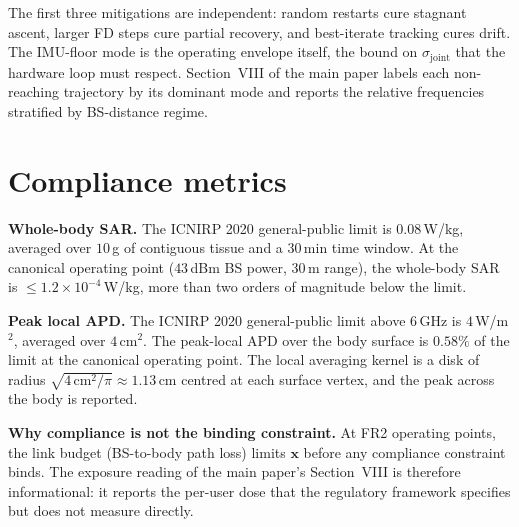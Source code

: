 \documentclass[10pt,journal,twocolumn]{IEEEtran}
\newcommand{\xx}{\mathbf{x}}
\theoremstyle{plain}
\theoremstyle{definition}
\begin{document}
The first three mitigations are independent: random restarts cure
stagnant ascent, larger FD steps cure partial recovery, and
best-iterate tracking cures drift. The IMU-floor mode is the
operating envelope itself, the bound on $\sigma_\mathrm{joint}$
that the hardware loop must respect. Section~VIII of the main
paper labels each non-reaching trajectory by its dominant mode and
reports the relative frequencies stratified by BS-distance regime.

\section{Compliance metrics}\label{si:compliance}

\textbf{Whole-body SAR.} The ICNIRP 2020 general-public limit is
$0.08\,$W/kg, averaged over $10\,$g of contiguous tissue and a
$30\,$min time window. At the canonical operating point
($43\,$dBm BS power, $30\,$m range), the whole-body SAR is
$\leq 1.2 \times 10^{-4}\,$W/kg, more than two orders of magnitude
below the limit.

\textbf{Peak local APD.} The ICNIRP 2020 general-public limit
above $6\,$GHz is $4\,$W/m$^{2}$, averaged over $4\,$cm$^{2}$. The
peak-local APD over the body surface is $0.58\%$ of the limit at
the canonical operating point. The local averaging kernel is a
disk of radius $\sqrt{4\,\mathrm{cm}^{2}/\pi} \approx 1.13\,$cm
centred at each surface vertex, and the peak across the body is
reported.

\textbf{Why compliance is not the binding constraint.} At FR2
operating points, the link budget (BS-to-body path loss) limits
$\xx$ before any compliance constraint binds. The exposure reading
of the main paper's Section~VIII is therefore informational: it
reports the per-user dose that the regulatory framework specifies
but does not measure directly.
\end{document}
